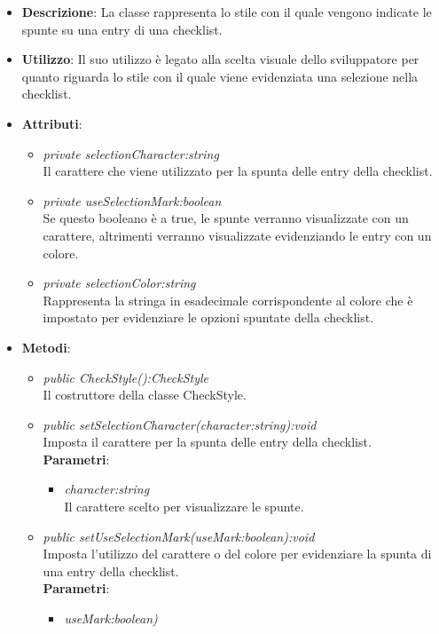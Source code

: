 \begin{itemize}
\item \textbf{Descrizione}: La classe rappresenta lo stile con il quale vengono indicate le spunte su una entry di una checklist.
\item \textbf{Utilizzo}: Il suo utilizzo è legato alla scelta visuale dello sviluppatore per quanto riguarda lo stile con il quale viene evidenziata una selezione nella checklist.
\item \textbf{Attributi}:
	\begin{itemize}
	\item \textit{private selectionCharacter:string}\\
	Il carattere che viene utilizzato per la spunta delle entry della checklist.
	\item \textit{private useSelectionMark:boolean}\\
	Se questo booleano è a true, le spunte verranno visualizzate con un carattere, altrimenti verranno visualizzate evidenziando le entry con un colore.
	\item \textit{private selectionColor:string}\\
	Rappresenta la stringa in esadecimale corrispondente al colore che è impostato per evidenziare le opzioni spuntate della checklist.
	\end{itemize}
\item \textbf{Metodi}:
	\begin{itemize}
	\item \textit{public CheckStyle():CheckStyle}\\
	Il costruttore della classe CheckStyle.
	\item \textit{public setSelectionCharacter(character:string):void}\\
	Imposta il carattere per la spunta delle entry della checklist.
		\\ \textbf{Parametri}: \begin{itemize}
		\item \textit{character:string}\\
		Il carattere scelto per visualizzare le spunte.
		\end{itemize} 
	\item \textit{public setUseSelectionMark(useMark:boolean):void}\\
	Imposta l'utilizzo del carattere o del colore per evidenziare la spunta di una entry della checklist.
		\\ \textbf{Parametri}: \begin{itemize}
		\item \textit{useMark:boolean)}\\

\end{itemize}
\end{itemize}
\end{itemize}

